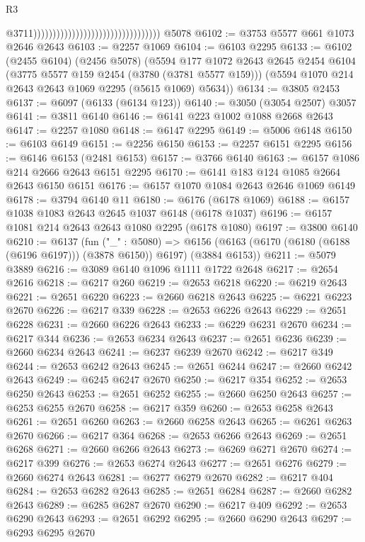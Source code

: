 \begin{lexlean}{R3}
\begin{coremodule}
                                                                      @3711)))))))))))))))))))))))))))))))))
    @5078
@6102 := @3753 @5577 @661 @1073 @2646 @2643
@6103 := @2257 @1069
@6104 := @6103 @2295
@6133 := @6102
    (@2455 @6104)
    (@2456 @5078)
    (@5594
      @177
      @1072
      @2643
      @2645
      @2454
      @6104
      (@3775 @5577 @159 @2454 (@3780 (@3781 @5577 @159)))
      (@5594 @1070 @214 @2643 @2643 @1069 @2295 (@5615 @1069) @5634))
@6134 := @3805 @2453
@6137 := @6097 (@6133 (@6134 @123))
@6140 := @3050 (@3054 @2507) @3057
@6141 := @3811 @6140
@6146 := @6141 @223 @1002 @1088 @2668 @2643
@6147 := @2257 @1080
@6148 := @6147 @2295
@6149 := @5006 @6148
@6150 := @6103 @6149
@6151 := @2256 @6150
@6153 := @2257 @6151 @2295
@6156 := @6146 @6153 (@2481 @6153)
@6157 := @3766 @6140
@6163 := @6157 @1086 @214 @2666 @2643 @6151 @2295
@6170 := @6141 @183 @124 @1085 @2664 @2643 @6150 @6151
@6176 := @6157 @1070 @1084 @2643 @2646 @1069 @6149
@6178 := @3794 @6140 @11
@6180 := @6176 (@6178 @1069)
@6188 := @6157 @1038 @1083 @2643 @2645 @1037 @6148 (@6178 @1037)
@6196 := @6157 @1081 @214 @2643 @2643 @1080 @2295 (@6178 @1080)
@6197 := @3800 @6140
@6210 := @6137
    (fun ("_" : @5080) =>
    @6156 (@6163 (@6170 (@6180 (@6188 (@6196 @6197))) (@3878 @6150)) @6197) (@3884 @6153))
@6211 := @5079 @3889
@6216 := @3089 @6140 @1096 @1111 @1722 @2648
@6217 := @2654 @2616
@6218 := @6217 @260
@6219 := @2653 @6218
@6220 := @6219 @2643
@6221 := @2651 @6220
@6223 := @2660 @6218 @2643
@6225 := @6221 @6223 @2670
@6226 := @6217 @339
@6228 := @2653 @6226 @2643
@6229 := @2651 @6228
@6231 := @2660 @6226 @2643
@6233 := @6229 @6231 @2670
@6234 := @6217 @344
@6236 := @2653 @6234 @2643
@6237 := @2651 @6236
@6239 := @2660 @6234 @2643
@6241 := @6237 @6239 @2670
@6242 := @6217 @349
@6244 := @2653 @6242 @2643
@6245 := @2651 @6244
@6247 := @2660 @6242 @2643
@6249 := @6245 @6247 @2670
@6250 := @6217 @354
@6252 := @2653 @6250 @2643
@6253 := @2651 @6252
@6255 := @2660 @6250 @2643
@6257 := @6253 @6255 @2670
@6258 := @6217 @359
@6260 := @2653 @6258 @2643
@6261 := @2651 @6260
@6263 := @2660 @6258 @2643
@6265 := @6261 @6263 @2670
@6266 := @6217 @364
@6268 := @2653 @6266 @2643
@6269 := @2651 @6268
@6271 := @2660 @6266 @2643
@6273 := @6269 @6271 @2670
@6274 := @6217 @399
@6276 := @2653 @6274 @2643
@6277 := @2651 @6276
@6279 := @2660 @6274 @2643
@6281 := @6277 @6279 @2670
@6282 := @6217 @404
@6284 := @2653 @6282 @2643
@6285 := @2651 @6284
@6287 := @2660 @6282 @2643
@6289 := @6285 @6287 @2670
@6290 := @6217 @409
@6292 := @2653 @6290 @2643
@6293 := @2651 @6292
@6295 := @2660 @6290 @2643
@6297 := @6293 @6295 @2670

\end{coremodule}
\end{lexlean}
